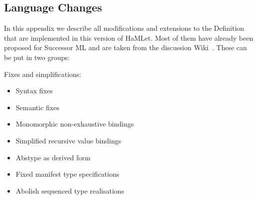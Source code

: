 \documentclass[twoside,titlepage]{article}
\begin{document}
\begin{appendix}
\section{Language Changes}
\label{extensions}

In this appendix we describe all modifications and extensions to the Definition that are implemented in this version of HaMLet. Most of them have already been proposed for Successor ML and are taken from the discussion Wiki~\cite{successorml}. These can be put in two groups:

Fixes and simplifications:
\begin{itemize}
\setlength{\itemsep}{0em}
\item Syntax fixes
\item Semantic fixes
\item Monomorphic non-exhaustive bindings
\item Simplified recursive value bindings
\item Abstype as derived form
\item Fixed manifest type specifications
\item Abolish sequenced type realisations
\end{itemize}


\end{appendix}
\end{document}
